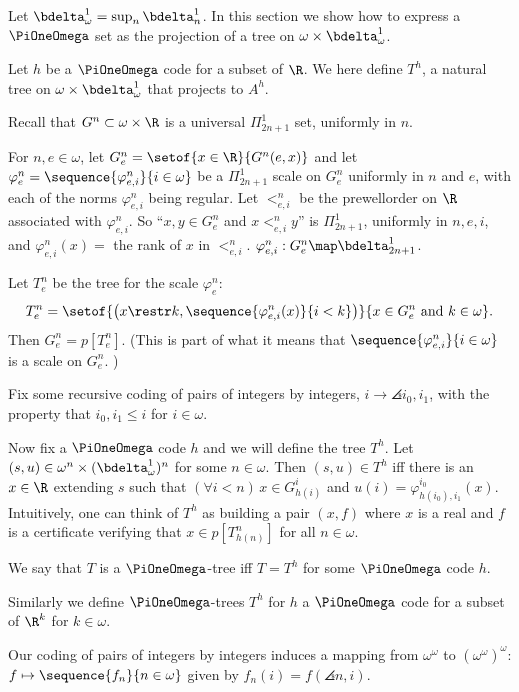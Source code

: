 \documentclass[oneside,12pt]{amsart}
\begin{document}
Let $\bdelta^1_{\omega} = \sup_n \bdelta^1_n$. In this section we show how to
express a $\PiOneOmega$ set as the projection
of a tree on $\omega\times \bdelta^1_{\omega}$.

\begin{definition}
Let $h$ be a $\PiOneOmega$ code for a subset of $\R$.
We here define $T^{h}$,  a natural tree  on $\omega\times\bdelta^1_{\omega}$ that projects to $A^h$.

Recall that $G^n\subset\omega\times\R$ is a universal $\Pi^1_{2n+1}$ set, uniformly in $n$.

For $n,e\in\omega$, let $G^n_e = \setof{x\in\R}{G^n(e, x)}$ and
let $\varphi^n_e = \sequence{\varphi^n_{e,i}}{i\in\omega}$ be a $\Pi^1_{2n+1}$ scale on $G^n_e$ uniformly in $n$ and $e$,
with each of the norms $\varphi^n_{e,i}$ being regular.
Let $<^n_{e,i}$ be the prewellorder on $\R$ associated with $\varphi^n_{e,i}$. So ``$x,y\in G^n_e$ and $x <^n_{e,i} y$'' is
$\Pi^1_{2n+1}$, uniformly in $n,e,i$, and $\varphi^n_{e,i}(x) = $ the rank of $x$ in $<^n_{e,i}$.
$\varphi^n_{e,i} : G^n_e \map \bdelta^1_{2n+1}$.

Let $T^n_e$ be the tree for the scale $\varphi^n_e$:
$$T^n_e = \setof{\left(x\restr k,\sequence{\varphi^n_{e,i}(x)}{i<k}\right)}{x\in G^n_e \text{ and } k\in\omega}.$$
Then $G^n_e=p[T^n_e]$. (This is part of what it means that 
$\sequence{\varphi^n_{e,i}}{i\in\omega}$ is a scale on $G^n_e$. )

Fix some recursive coding of pairs of integers by integers, $i\to\angles{i_0,i_1}$,
with the property that $i_0,i_1\leq i$ for $i\in\omega$.

Now fix a $\PiOneOmega$ code $h$ and we will define the tree $T^h$.
Let $(s,u) \in \omega^n\times(\bdelta^1_{\omega})^n$ for some $n\in\omega$. Then $(s,u)\in T^h$ iff there is an
$x\in\R$ extending $s$ such that $(\forall i<n)\, x\in G^{i}_{h(i)}$ and
$u(i)=\varphi^{i_0}_{h(i_0),i_1}(x)$. Intuitively, one can think of $T^h$ as building a pair $(x,f)$
where $x$ is a real and $f$ is a certificate verifying that $x\in p[T^n_{h(n)}]$ for all $n\in\omega$.

We say that $T$ is a $\PiOneOmega$-tree iff $T=T^h$ for some $\PiOneOmega$ code $h$.

Similarly we define $\PiOneOmega$-trees $T^h$ for $h$ a $\PiOneOmega$ code for a
subset of $\R^k$ for $k\in\omega$.
\end{definition}

Our coding of pairs of integers by integers induces a mapping from $\omega^{\omega}$ to $(\omega^{\omega})^{\omega}$: 
$f\mapsto\sequence{f_n}{n\in\omega}$ given by $f_n(i) = f(\angles{n,i})$.
\end{document}
